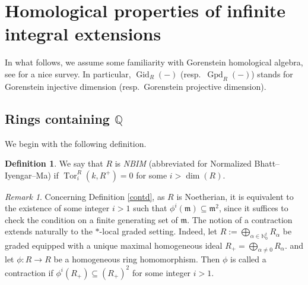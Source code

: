 \documentclass[12pt,reqno]{amsart}
\theoremstyle{definition}
\newtheorem{definition}[theorem]{Definition}
\theoremstyle{remark}
\newtheorem{remark}[theorem]{Remark}
\theoremstyle{cited}
\theoremstyle{remark}
\theoremstyle{citeddef}
\begin{document}
	
	
	\section{Homological properties of infinite integral extensions}
	
	
	
	
	
	In what follows, we assume some familiarity with Gorenstein homological algebra, see \cite{Totally}
	for a nice survey. In particular, 
	$\operatorname{Gid}_R(-)$ (resp.~$\operatorname{Gpd}_R(-)$) stands for Gorenstein injective dimension (resp.~Gorenstein projective dimension).
	\subsection{Rings containing \(\mathbb{Q}\)}
	
	We begin with the following definition.
	
	\begin{definition}\label{3.1}
		We say that \(R\) is \textit{NBIM} (abbreviated for Normalized Bhatt--Iyengar--Ma) if
		\(
		\operatorname{Tor}_i^R(k, R^+) = 0
		\)
		for some \(i > \dim(R)\).
	\end{definition}
	
	\begin{remark}
		Concerning {Definition} \ref{contd}, 
		as \( R \) is Noetherian, it is equivalent to the existence of some integer \( i > 1 \) such that \( \phi^i(\mathfrak{m}) \subseteq \mathfrak{m}^2 \), since it suffices to check the condition on a finite generating set of \( \mathfrak{m} \).
		The notion of a contraction extends naturally to the \( \ast \)-local graded setting. Indeed, let \( R := \bigoplus_{\alpha \in \mathbb{N}_0^t} R_\alpha \) be graded equipped with a unique maximal homogeneous ideal
		\(
		R_+=\bigoplus_{\alpha\neq 0}R_\alpha.
		\) and let \( \phi: R \to R \) be a homogeneous ring homomorphism. Then \( \phi \) is called a contraction if 
		\(
		\phi^i(R_+) \subseteq (R_+)^2
		\)
		for some integer \( i > 1 \).
	\end{remark}
	
\end{document}
